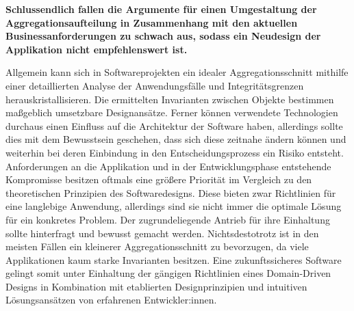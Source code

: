 \textbf{Schlussendlich fallen die Argumente für einen Umgestaltung der Aggregationsaufteilung in Zusammenhang mit den aktuellen Businessanforderungen zu schwach aus, sodass ein Neudesign der Applikation nicht empfehlenswert ist.}

Allgemein kann sich in Softwareprojekten ein idealer Aggregationsschnitt mithilfe einer detaillierten Analyse der Anwendungsfälle und Integritätsgrenzen herauskristallisieren. Die ermittelten Invarianten zwischen Objekte bestimmen maßgeblich umsetzbare Designansätze. Ferner können verwendete Technologien durchaus einen Einfluss auf die Architektur der Software haben, allerdings sollte dies mit dem Bewusstsein geschehen, dass sich diese zeitnahe ändern können und weiterhin bei deren Einbindung in den Entscheidungsprozess ein Risiko entsteht. Anforderungen an die Applikation und in der Entwicklungsphase entstehende Kompromisse besitzen oftmals eine größere Priorität im Vergleich zu den theoretischen Prinzipien des Softwaredesigns. Diese bieten zwar Richtlinien für eine langlebige Anwendung, allerdings sind sie nicht immer die optimale Lösung für ein konkretes Problem. Der zugrundeliegende Antrieb für ihre Einhaltung sollte hinterfragt und bewusst gemacht werden. Nichtsdestotrotz ist in den meisten Fällen ein kleinerer Aggregationsschnitt zu bevorzugen, da viele Applikationen kaum starke Invarianten besitzen. Eine zukunftssicheres Software gelingt somit unter Einhaltung der gängigen Richtlinien eines Domain-Driven Designs in Kombination mit etablierten Designprinzipien und intuitiven Lösungsansätzen von erfahrenen Entwickler:innen.  

